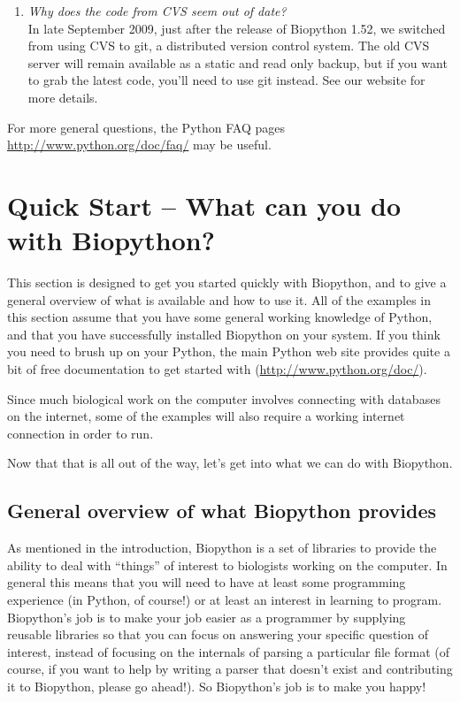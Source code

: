 \documentclass{report}
\begin{document}
\begin{enumerate}
 \item \emph{Why does the code from CVS seem out of date?} \\
  In late September 2009, just after the release of Biopython 1.52, we switched from using CVS to git, a distributed version control system. The old CVS server will remain available as a static and read only backup, but if you want to grab the latest code, you'll need to use git instead. See our website for more details.
\end{enumerate}

\noindent For more general questions, the Python FAQ pages \url{http://www.python.org/doc/faq/} may be useful.

\chapter{Quick Start -- What can you do with Biopython?}
\label{chapter:quick-start}

This section is designed to get you started quickly with Biopython, and to give a general overview of what is available and how to use it. All of the examples in this section assume that you have some general working knowledge of Python, and that you have successfully installed Biopython on your system. If you think you need to brush up on your Python, the main Python web site provides quite a bit of free documentation to get started with (\url{http://www.python.org/doc/}).

Since much biological work on the computer involves connecting with databases on the internet, some of the examples will also require a working internet connection in order to run.

Now that that is all out of the way, let's get into what we can do with Biopython.

\section{General overview of what Biopython provides}

As mentioned in the introduction, Biopython is a set of libraries to provide the ability to deal with ``things'' of interest to biologists working on the computer. In general this means that you will need to have at least some programming experience (in Python, of course!) or at least an interest in learning to program. Biopython's job is to make your job easier as a programmer by supplying reusable libraries so that you can focus on answering your specific question of interest, instead of focusing on the internals of parsing a particular file format (of course, if you want to help by writing a parser that doesn't exist and contributing it to Biopython, please go ahead!). So Biopython's job is to make you happy!
\end{document}
